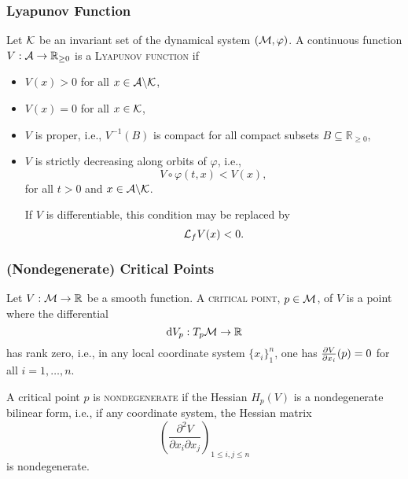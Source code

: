 \begin{frame}
    \frametitle{Lyapunov Function}

    \begin{definition}
        Let $\mathcal{K}$ be an invariant set of the dynamical system $(\mathcal{M},
        \varphi)$. A continuous function $V: \mathcal{A} \rightarrow \mathbb{R}_{\geq
        0}$ is a \textsc{Lyapunov function} if

        \begin{itemize}
            \item $V(x) > 0$ for all $x \in \mathcal{A} \backslash \mathcal{K}$,
            \item $V(x) = 0$ for all $x \in \mathcal{K}$,
            \item $V$ is proper, i.e., $V^{-1}(B)$ is compact for all compact
            subsets $B \subseteq \mathbb{R}_{\geq 0}$,
            \item $V$ is strictly decreasing along orbits of $\varphi$, i.e.,
            \vspace{-1mm}
            \[ V \circ \varphi(t,x) < V(x), \] \vspace{-1mm} for all $t > 0$ and
            $x \in \mathcal{A} \backslash \mathcal{K}$.

            If $V$ is differentiable, this condition may be replaced by
            \[ \mathcal{L}_fV(x) < 0. \]
        \end{itemize}
    \end{definition}
\end{frame}


\begin{frame}
    \frametitle{(Nondegenerate) Critical Points}

    \begin{definition}
        Let $V: \mathcal{M} \rightarrow \mathbb{R}$ be a smooth function. A
        \textsc{critical point}, $p \in \mathcal{M}$, of $V$ is a point where the
        differential \[ \operatorname{d}\! V_p: T_p\mathcal{M} \rightarrow \mathbb{R} \] has rank
        zero, i.e., in any local coordinate system $\{x_i\}_{1}^n$, one has
        $\frac{\partial V}{\partial x_i}(p) = 0$ for all $i = 1, \ldots, n$.
    \end{definition}

    \begin{definition}
        A critical point $p$ is \textsc{nondegenerate} if the Hessian $H_p(V)$
        is a nondegenerate bilinear form, i.e., if any coordinate system, the
        Hessian matrix \[ \left( \frac{ \partial^2 V }{ \partial x_i \partial
        x_j } \right)_{1 \leq i,j \leq n} \] is nondegenerate.
    \end{definition}
\end{frame}


